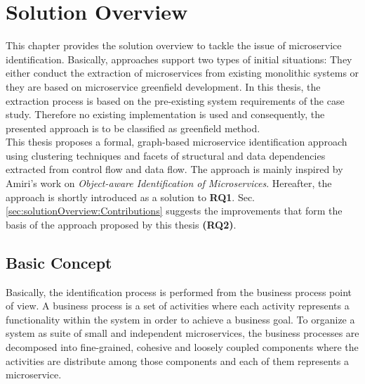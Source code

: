 \chapter{Solution Overview}
\label{ch:SolutionOverview}
This chapter provides the solution overview to tackle the issue of microservice identification. Basically, approaches support two types of initial situations: They either conduct the extraction of microservices from existing monolithic systems or they are based on microservice greenfield development. In this thesis, the extraction process is based on the pre-existing system requirements of the case study. Therefore no existing implementation is used and consequently, the presented approach is to be classified as greenfield method.\\
This thesis proposes a formal, graph-based microservice identification approach using clustering techniques and facets of structural and data dependencies extracted from control flow and data flow. The approach is mainly inspired by Amiri's  work on \textit{Object-aware Identification of Microservices}. Hereafter, the approach \cite{ObjectAwareAmiri} is shortly introduced as a solution to \textbf{RQ1}. Sec.\ref{sec:solutionOverview:Contributions} suggests the improvements that form the basis of the approach proposed by this thesis \textbf{(RQ2)}.


\section{Basic Concept}
\label{sec:solutionOverview:basicConcept}
Basically, the identification process is performed from the business process point of view. A business process is a set of activities where each activity represents a functionality within the system in order to achieve a business goal. To organize a system as suite of small and independent microservices, the business processes are decomposed into fine-grained, cohesive and loosely coupled components where the activities are distribute among those components and each of them represents a microservice.\\



